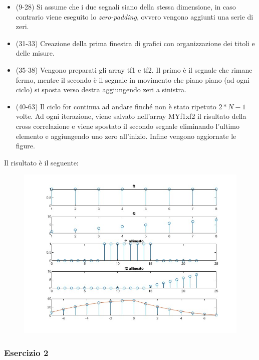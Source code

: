 \documentclass[a4paper]{article}
\begin{document}
	\begin{itemize}
		\item (9-28) Si assume che i due segnali siano della stessa dimensione, in caso contrario viene eseguito lo \emph{zero-padding}, ovvero vengono aggiunti una serie di zeri.
		
		\item (31-33) Creazione della prima finestra di grafici con organizzazione dei titoli e delle misure.
		
		\item (35-38) Vengono preparati gli array \textsf{tf1} e \textsf{tf2}. Il primo è il segnale che rimane fermo, mentre il secondo è il segnale in movimento che piano piano (ad ogni ciclo) si sposta verso destra aggiungendo zeri a sinistra.
		
		\item (40-63) Il ciclo \textsf{for} continua ad andare finché non è stato ripetuto $2*N-1$ volte. Ad ogni iterazione, viene salvato nell'array \textsf{MYf1xf2} il risultato della cross correlazione e viene spostato il secondo segnale eliminando l'ultimo elemento e aggiungendo uno zero all'inizio. Infine vengono aggiornate le figure.
	\end{itemize}\newpage
	
	\noindent
	Il risultato è il seguente:
	
	\noindent
	\begin{figure}[!htp]
		\centering
		\includegraphics[width=\textwidth]{img/lab/cross-correlazione-7.jpg}
	\end{figure}\newpage
	
	\subsubsection{Esercizio 2}
	
\end{document}
